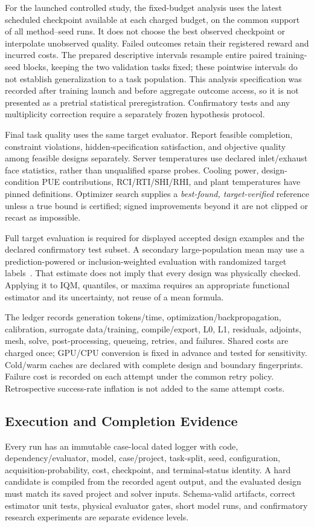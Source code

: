 For the launched controlled study, the fixed-budget analysis uses the latest scheduled checkpoint available at each charged budget, on the common support of all method--seed runs. It does not choose the best observed checkpoint or interpolate unobserved quality. Failed outcomes retain their registered reward and incurred costs. The prepared descriptive intervals resample entire paired training-seed blocks, keeping the two validation tasks fixed; these pointwise intervals do not establish generalization to a task population. This analysis specification was recorded after training launch and before aggregate outcome access, so it is not presented as a pretrial statistical preregistration. Confirmatory tests and any multiplicity correction require a separately frozen hypothesis protocol.

Final task quality uses the same target evaluator. Report feasible completion, constraint violations, hidden-specification satisfaction, and objective quality among feasible designs separately. Server temperatures use declared inlet/exhaust face statistics, rather than unqualified sparse probes. Cooling power, design-condition PUE contributions, RCI/RTI/SHI/RHI, and plant temperatures have pinned definitions. Optimizer search supplies a \emph{best-found, target-verified} reference unless a true bound is certified; signed improvements beyond it are not clipped or recast as impossible.

Full target evaluation is required for displayed accepted design examples and the declared confirmatory test subset. A secondary large-population mean may use a prediction-powered or inclusion-weighted evaluation with randomized target labels~\cite{angelopoulos2024ppipp,zrnic2024active}. That estimate does not imply that every design was physically checked. Applying it to IQM, quantiles, or maxima requires an appropriate functional estimator and its uncertainty, not reuse of a mean formula.

The ledger records generation tokens/time, optimization/backpropagation, calibration, surrogate data/training, compile/export, L0, L1, residuals, adjoints, mesh, solve, post-processing, queueing, retries, and failures. Shared costs are charged once; GPU/CPU conversion is fixed in advance and tested for sensitivity. Cold/warm caches are declared with complete design and boundary fingerprints. Failure cost is recorded on each attempt under the common retry policy. Retrospective success-rate inflation is not added to the same attempt costs.

\subsection{Execution and Completion Evidence}
Every run has an immutable case-local dated logger with code, dependency/evaluator, model, case/project, task-split, seed, configuration, acquisition-probability, cost, checkpoint, and terminal-status identity. A hard candidate is compiled from the recorded agent output, and the evaluated design must match its saved project and solver inputs. Schema-valid artifacts, correct estimator unit tests, physical evaluator gates, short model runs, and confirmatory research experiments are separate evidence levels.

